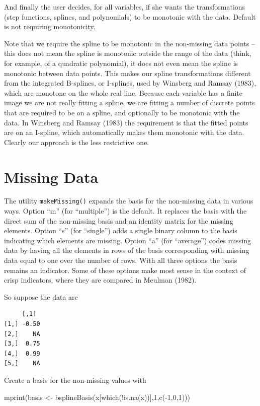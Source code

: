 \documentclass[
  12pt,
  letterpaper,
  DIV=11,
  numbers=noendperiod]{scrreprt}
\newenvironment{Shaded}{\begin{snugshade}}{\end{snugshade}}
\newcommand{\DecValTok}[1]{\textcolor[rgb]{0.68,0.00,0.00}{#1}}
\newcommand{\FunctionTok}[1]{\textcolor[rgb]{0.28,0.35,0.67}{#1}}
\newcommand{\NormalTok}[1]{\textcolor[rgb]{0.00,0.23,0.31}{#1}}
\newcommand{\OtherTok}[1]{\textcolor[rgb]{0.00,0.23,0.31}{#1}}
\newcommand{\SpecialCharTok}[1]{\textcolor[rgb]{0.37,0.37,0.37}{#1}}
\begin{document}
And finally the user decides, for all variables, if she wants the
transformations (step functions, splines, and polynomials) to be
monotonic with the data. Default is not requiring monotonicity.

Note that we require the spline to be monotonic in the non-missing data
points -- this does not mean the spline is monotonic outside the range
of the data (think, for example, of a quadratic polynomial), it does not
even mean the spline is monotonic between data points. This makes our
spline transformations different from the integrated B-splines, or
I-splines, used by Winsberg and Ramsay (1983), which are monotone on the
whole real line. Because each variable has a finite image we are not
really fitting a spline, we are fitting a number of discrete points that
are required to be on a spline, and optionally to be monotonic with the
data. In Winsberg and Ramsay (1983) the requirement is that the fitted
points are on an I-spline, which automatically makes them monotonic with
the data. Clearly our approach is the less restrictive one.

\section{Missing Data}\label{missing-data}

The utility \texttt{makeMissing()} expands the basis for the non-missing
data in various ways. Option ``m'' (for ``multiple'') is the default. It
replaces the basis with the direct sum of the non-missing basis and an
identity matrix for the missing elements. Option ``s'' (for ``single'')
adds a single binary column to the basis indicating which elements are
missing. Option ``a'' (for ``average'') codes missing data by having all
the elements in rows of the basis corresponding with missing data equal
to one over the number of rows. With all three options the basis remains
an indicator. Some of these options make most sense in the context of
crisp indicators, where they are compared in Meulman (1982).

So suppose the data are

\begin{verbatim}
     [,1] 
[1,] -0.50
[2,]    NA
[3,]  0.75
[4,]  0.99
[5,]    NA
\end{verbatim}

Create a basis for the non-missing values with

\begin{Shaded}
\begin{Highlighting}[]
\FunctionTok{mprint}\NormalTok{(basis }\OtherTok{\textless{}{-}} \FunctionTok{bsplineBasis}\NormalTok{(x[}\FunctionTok{which}\NormalTok{(}\SpecialCharTok{!}\FunctionTok{is.na}\NormalTok{(x))],}\DecValTok{1}\NormalTok{,}\FunctionTok{c}\NormalTok{(}\SpecialCharTok{{-}}\DecValTok{1}\NormalTok{,}\DecValTok{0}\NormalTok{,}\DecValTok{1}\NormalTok{)))}
\end{Highlighting}
\end{Shaded}
\end{document}
